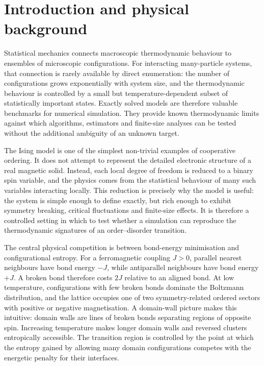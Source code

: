 \documentclass[twoside,twocolumn,9pt]{extarticle}
\begin{document}

\renewcommand*\rmdefault{bch}\normalfont\upshape
\rmfamily


\section{Introduction and physical background}

Statistical mechanics connects macroscopic thermodynamic behaviour to ensembles of microscopic configurations. For interacting many-particle systems, that connection is rarely available by direct enumeration: the number of configurations grows exponentially with system size, and the thermodynamic behaviour is controlled by a small but temperature-dependent subset of statistically important states. Exactly solved models are therefore valuable benchmarks for numerical simulation. They provide known thermodynamic limits against which algorithms, estimators and finite-size analyses can be tested without the additional ambiguity of an unknown target.

The Ising model is one of the simplest non-trivial examples of cooperative ordering.\cite{ising1925} It does not attempt to represent the detailed electronic structure of a real magnetic solid. Instead, each local degree of freedom is reduced to a binary spin variable, and the physics comes from the statistical behaviour of many such variables interacting locally. This reduction is precisely why the model is useful: the system is simple enough to define exactly, but rich enough to exhibit symmetry breaking, critical fluctuations and finite-size effects. It is therefore a controlled setting in which to test whether a simulation can reproduce the thermodynamic signatures of an order--disorder transition.

The central physical competition is between bond-energy minimisation and configurational entropy. For a ferromagnetic coupling \(J>0\), parallel nearest neighbours have bond energy \(-J\), while antiparallel neighbours have bond energy \(+J\). A broken bond therefore costs \(2J\) relative to an aligned bond. At low temperature, configurations with few broken bonds dominate the Boltzmann distribution, and the lattice occupies one of two symmetry-related ordered sectors with positive or negative magnetisation. A domain-wall picture makes this intuitive: domain walls are lines of broken bonds separating regions of opposite spin. Increasing temperature makes longer domain walls and reversed clusters entropically accessible. The transition region is controlled by the point at which the entropy gained by allowing many domain configurations competes with the energetic penalty for their interfaces.
\end{document}
